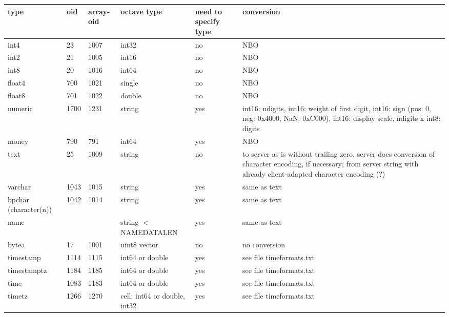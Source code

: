\documentclass[a4paper,landscape]{article}
\begin{document}
\begin{longtable}{lp{40mm}p{40mm}p{50mm}p{40mm}p{50mm}}
type &
oid &
array-oid &
octave type &
need to specify type &
conversion \\\hline

int4 &
23 &
1007 &
int32 &
no &
NBO \\

int2 &
21 &
1005 &
int16 &
no &
NBO \\

int8 &
20 &
1016 &
int64 &
no &
NBO \\

float4 &
700 &
1021 &
single &
no &
NBO \\

float8 &
701 &
1022 &
double &
no &
NBO \\

numeric &
1700 &
1231 &
string &
yes &
int16: ndigits, int16: weight of first digit, int16: sign (pos: 0,
neg: 0x4000, NaN: 0xC000), int16: display scale, ndigits x int8:
digits \\

money &
790 &
791 &
int64 &
yes &
NBO \\

text &
25 &
1009 &
string &
no &
to server as is without trailing zero, server does conversion of
character encoding, if necessary; from server string with already
client-adapted character encoding (?) \\

varchar &
1043 &
1015 &
string &
yes &
same as text \\

bpchar (character(n)) &
1042 &
1014 &
string &
yes &
same as text \\

name &
&
&
string $<$ NAMEDATALEN &
yes &
same as text \\

bytea &
17 &
1001 &
uint8 vector &
no &
no conversion \\

timestamp &
1114 &
1115 &
int64 or double &
yes &
see file timeformats.txt \\

timestamptz &
1184 &
1185 &
int64 or double &
yes &
see file timeformats.txt \\

time &
1083 &
1183 &
int64 or double &
yes &
see file timeformats.txt \\

timetz &
1266 &
1270 &
cell: int64 or double, int32 &
yes &
see file timeformats.txt \\


\end{longtable}
\end{document}

